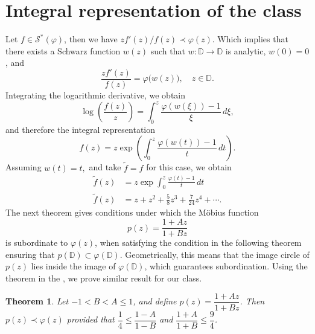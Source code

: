 \documentclass[a4paper,12pt,reqno]{amsart} %
\numberwithin{equation}{section}
\newtheorem{thm}{Theorem}[section]
\theoremstyle{definition}
\begin{document}
\section{Integral representation of the class}
Let $f \in \mathcal{S}^*(\varphi)$, then we have  ${z f'(z)}/{f(z)} \prec \varphi(z)$. Which implies that there exists a Schwarz function $w(z)$ such that $w:\mathbb{D}\to\mathbb{D}$ is analytic, $w(0)=0$, and
\[
\frac{z f'(z)}{f(z)}=\varphi\big(w(z)\big), \quad z \in \mathbb{D}.
\]
Integrating the logarithmic derivative, we obtain
\[
\log\!\left(\frac{f(z)}{z}\right)
=\int_{0}^{z}\frac{\varphi(w(\xi))-1}{\xi}\,d\xi,
\]
and therefore the integral representation
\begin{equation}\label{eq:3.1}
f(z) = z \exp\!\left( \int_{0}^{z} \frac{\varphi(w(t)) - 1}{t}\, dt \right).
\end{equation}
Assuming $w(t)=t,$ and take $\widetilde{f}=f$ for this case, we obtain
\begin{align}\label{eq:3.2}
\widetilde{f}(z)&=z \exp \int_{0}^{z} \frac{\varphi(t)-1}{t}\, dt \\
\widetilde{f}(z)&=z+ z^2+ \frac{5}{8}z^3+ \frac{7 }{24}z^4+ \cdots.
\end{align}
The next theorem gives conditions under which the M\"obius function
\[
p(z) = \frac{1 + A z}{1 + B z}
\]
is subordinate to $\varphi(z)$, when satisfying the condition in the following theorem
ensuring that $p(\mathbb{D}) \subset \varphi(\mathbb{D})$.
Geometrically, this means that the image circle of $p(z)$ lies inside the image
of $\varphi(\mathbb{D})$, which guarantees subordination.
Using the theorem in the \cite{GoelKumar2020}, we prove similar result for our class.
\begin{thm}
Let $-1 < B < A \leq 1$, and define $p(z) = \dfrac{1 + Az}{1 + Bz}$. Then \( p(z) \prec \varphi(z) \) provided that \( \dfrac{1}{4} \leq \dfrac{1 - A}{1 - B} \) and \( \dfrac{1 + A}{1 + B} \leq \dfrac{9}{4} \).
\end{thm}
\end{document}
